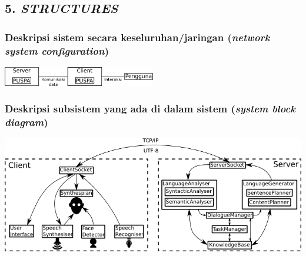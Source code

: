 \subsection*{\textcolor{subsectioncolor}{\textsf{5. \textit{STRUCTURES}}}}

\subsubsection*{Deskripsi sistem secara keseluruhan\slash jaringan (\textit{network system configuration})}
\includegraphics[width=0.5\textwidth]{Sistem}

\subsubsection*{Deskripsi subsistem yang ada di dalam sistem (\textit{system block diagram})}
\includegraphics[width=1.0\textwidth]{DiagramBlok}
